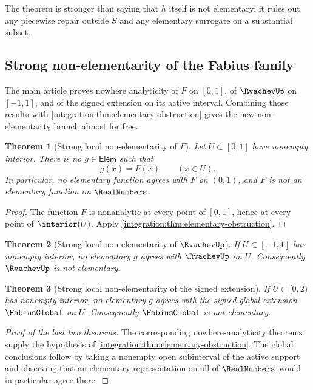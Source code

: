 \documentclass[11pt,oneside]{article}
\newtheorem{theorem}{Theorem}[section]
\theoremstyle{definition}
\theoremstyle{remark}
\begin{document}
The theorem is stronger than saying that $h$ itself is not elementary: it rules out any
piecewise repair outside $S$ and any elementary surrogate on a substantial subset.

\subsection{Strong non-elementarity of the Fabius family}
\label{integration:sec:not-elementary}

The main article proves nowhere analyticity of $F$ on $[0,1]$, of $\RvachevUp$ on $[-1,1]$, and of
the signed extension on its active interval.  Combining those results with
\cref{integration:thm:elementary-obstruction} gives the new non-elementarity branch almost for free.

\begin{theorem}[Strong local non-elementarity of $F$]
\label{integration:thm:fabius-strong-non-elementary}
Let $U\subset[0,1]$ have nonempty interior.  There is no $g\in\mathsf{Elem}$ such that
\begin{equation}
 g(x)=F(x)\qquad(x\in U).
 \label{integration:eq:elementary-F-agreement}
\end{equation}
In particular, no elementary function agrees with $F$ on $(0,1)$, and $F$ is not an
elementary function on $\RealNumbers$.
\end{theorem}

\begin{proof}
The function $F$ is nonanalytic at every point of $[0,1]$, hence at every point of
$\interior(U)$.  Apply \cref{integration:thm:elementary-obstruction}.
\end{proof}

\begin{theorem}[Strong local non-elementarity of $\RvachevUp$]
\label{integration:thm:up-strong-non-elementary}
If $U\subset[-1,1]$ has nonempty interior, no elementary $g$ agrees with $\RvachevUp$ on $U$.
Consequently $\RvachevUp$ is not elementary.
\end{theorem}

\begin{theorem}[Strong local non-elementarity of the signed extension]
\label{integration:thm:global-strong-non-elementary}
If $U\subset[0,2)$ has nonempty interior, no elementary $g$ agrees with the signed global
extension $\FabiusGlobal$ on $U$.  Consequently $\FabiusGlobal$ is not elementary.
\end{theorem}

\begin{proof}[Proof of the last two theorems]
The corresponding nowhere-analyticity theorems supply the hypothesis of
\cref{integration:thm:elementary-obstruction}.  The global conclusions follow by taking a nonempty open
subinterval of the active support and observing that an elementary representation on all of
$\RealNumbers$ would in particular agree there.
\end{proof}
\end{document}
